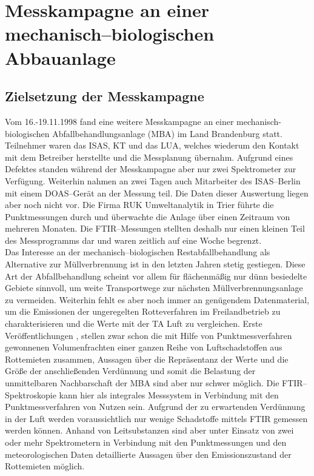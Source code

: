 \newpage
{}

\section{\label{mba}Messkampagne an einer mechanisch--biologischen
Abbauanlage}

\subsection{\label{zielmba}Zielsetzung der Messkampagne}

Vom 16.-19.11.1998 fand eine weitere Messkampagne an einer
mechanisch-biologischen Abfallbehandlungsanlage (MBA) im Land
Brandenburg statt. Teilnehmer waren das ISAS, KT und das LUA,
welches wiederum den Kontakt mit dem Betreiber herstellte und die
Messplanung übernahm. Aufgrund eines Defektes standen während der
Messkampagne aber nur zwei Spektrometer zur Verfügung. Weiterhin
nahmen an zwei Tagen auch Mitarbeiter des ISAS--Berlin mit einem
DOAS--Gerät an der Messung teil. Die Daten dieser Auswertung
liegen aber noch nicht vor. Die Firma RUK Umweltanalytik in Trier
führte die Punktmessungen durch und überwachte die Anlage über
einen Zeitraum von mehreren Monaten. Die FTIR--Messungen stellten
deshalb nur einen kleinen Teil des Messprogramms dar und waren
zeitlich auf eine Woche begrenzt.\\

Das Interesse an der mechanisch--biologischen Restabfallbehandlung
als Alternative zur Müllverbrennung ist in den letzten Jahren
stetig gestiegen. Diese Art der Abfallbehandlung scheint vor allem
für flächenmäßig nur dünn besiedelte Gebiete sinnvoll, um weite
Transportwege zur nächsten Müllverbrennungsanlage zu vermeiden.
Weiterhin fehlt es aber noch immer an genügendem Datenmaterial, um
die Emissionen der ungeregelten Rotteverfahren im Freilandbetrieb
zu charakterisieren und die Werte mit der TA Luft zu vergleichen.
Erste Veröffentlichungen \cite{turk97}, \cite{cuhls98} stellen
zwar schon die mit Hilfe von Punktmessverfahren gewonnenen
Volumenfrachten einer ganzen Reihe von Luftschadstoffen aus
Rottemieten zusammen, Aussagen über die Repräsentanz der Werte und
die Größe der anschließenden Verdünnung und somit die Belastung
der unmittelbaren Nachbarschaft der MBA sind aber nur schwer
möglich. Die FTIR--Spektroskopie kann hier als integrales
Messsystem in Verbindung mit den Punktmessverfahren von Nutzen
sein. Aufgrund der zu erwartenden Verdünnung in der Luft werden
voraussichtlich nur wenige Schadstoffe mittels FTIR gemessen
werden können. Anhand von Leitsubstanzen sind aber unter Einsatz
von zwei oder mehr Spektrometern in Verbindung mit den
Punktmessungen und den meteorologischen Daten detaillierte
Aussagen über den Emissionszustand der Rottemieten möglich.\\

